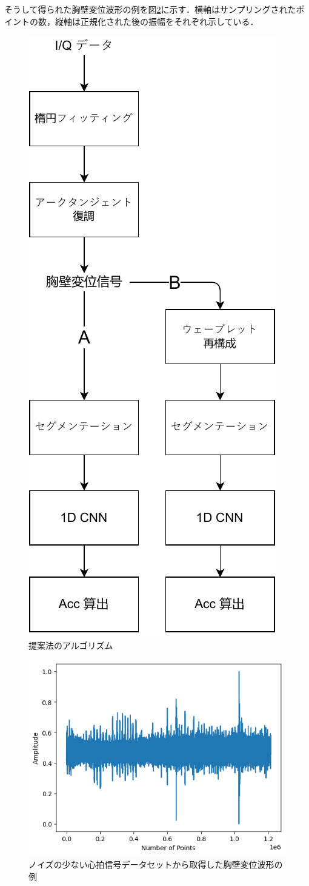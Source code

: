 そうして得られた胸壁変位波形の例を図\ref{fig:distance1}に示す．横軸はサンプリングされたポイントの数，縦軸は正規化された後の振幅をそれぞれ示している．

\begin{figure}[H]
  \begin{center}
  \includegraphics[width=0.5\linewidth]{./fig/proposed_method.pdf}
  \end{center}
  \caption{提案法のアルゴリズム}
  \label{fig:proposed_method}
\end{figure}

\begin{figure}[H]
\begin{center}
\includegraphics[width=\linewidth]{./fig/distance01.png}
\end{center}
\caption{ノイズの少ない心拍信号データセットから取得した胸壁変位波形の例}
\label{fig:distance1}
\end{figure}

